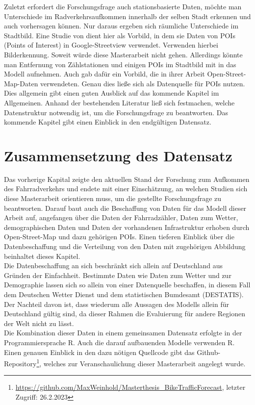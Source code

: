 \documentclass[a4paper,12pt]{thesis}
\begin{document}
Zuletzt erfordert die Forschungsfrage auch stationsbasierte Daten, möchte man Unterschiede im Radverkehrsaufkommen innerhalb der selben Stadt erkennen und auch vorhersagen können. Nur daraus ergeben sich räumliche Unterschiede im Stadtbild. Eine Studie von \cite{HANKEY2021102651} dient hier als Vorbild, in dem sie Daten von POIs (Points of Interest) in Google-Streetview verwendet. \cite{HANKEY2021102651} Verwenden hierbei Bilderkennung. Soweit würde diese Masterarbeit nicht gehen. Allerdings könnte man Entfernung von Zählstationen und einigen POIs im Stadtbild mit in das Modell aufnehmen. Auch \cite{Alattar2021} gab dafür ein Vorbild, die in ihrer Arbeit Open-Street-Map-Daten verwendeten. Genau dies ließe sich als Datenquelle für POIs nutzen. Dies allgemein gibt einen guten Ausblick auf das kommende Kapitel im Allgemeinen. Anhand der bestehenden Literatur ließ sich festmachen, welche Datenstruktur notwendig ist, um die Forschungsfrage zu beantworten. Das kommende Kapitel gibt einen Einblick in den endgültigen Datensatz.

\chapter{Zusammensetzung des Datensatz}\label{Datensatz}

Das vorherige Kapital zeigte den aktuellen Stand der Forschung zum Aufkommen des Fahrradverkehrs und endete mit einer Einschätzung, an welchen Studien sich diese Masterarbeit orientieren muss, um die gestellte Forschungsfrage zu beantworten. Darauf baut auch die Beschaffung von Daten für das Modell dieser Arbeit auf, angefangen über die Daten der Fahrradzähler, Daten zum Wetter, demographischen Daten und Daten der vorhandenen Infrastruktur erhoben durch Open-Street-Map und dazu gehörigen POIs. Einen tieferen Einblick über die Datenbeschaffung und die Verteilung von den Daten mit zugehörigen Abbildung beinhaltet dieses Kapitel.\\
Die Datenbeschaffung an sich beschränkt sich allein auf Deutschland aus Gründen der Einfachheit. Bestimmte Daten wie Daten zum Wetter und zur Demographie lassen sich so allein von einer Datenquelle beschaffen, in diesem Fall dem Deutschen Wetter Dienst und dem statistischen Bumdesamt (DESTATIS). Der Nachteil davon ist, dass wiederum alle Aussagen des Modells allein für Deutschland gültig sind, da dieser Rahmen die Evaluierung für andere Regionen der Welt nicht zu lässt.\\
Die Kombination dieser Daten in einem gemeinsamen Datensatz erfolgte in der Programmiersprache R. Auch die darauf aufbauenden Modelle verwenden R. Einen genauen Einblick in den dazu nötigen Quellcode gibt das Github-Repository\footnote{\url{https://github.com/MaxWeinhold/Masterthesis_BikeTrafficForecast}, letzter Zugriff: 26.2.2023}, welches zur Veranschaulichung dieser Masterarbeit angelegt wurde.
\end{document}
